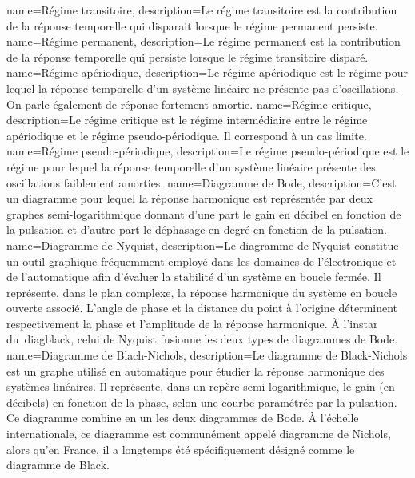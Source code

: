 %
{%
  name={Régime transitoire},%
  description={Le régime transitoire est la contribution de la réponse 
  temporelle qui disparait lorsque le régime permanent persiste.
  }
}
%
{%
  name={Régime permanent},%
  description={Le régime permanent est la contribution de la réponse temporelle 
  qui persiste lorsque le régime transitoire disparé.
  }
}
%
{%
  name={Régime apériodique},%
  description={Le régime apériodique est le régime pour lequel la réponse 
  temporelle d'un système linéaire ne présente pas d'oscillations. On parle
  également de réponse fortement amortie.
  }
}
%
{%
  name={Régime critique},%
  description={Le régime critique est le régime intermédiaire entre le régime
      apériodique et le régime pseudo-périodique. Il correspond à un cas limite.
  }
}
%
{%
  name={Régime pseudo-périodique},%
  description={Le régime pseudo-périodique est le régime pour lequel la réponse
  temporelle d'un système linéaire présente des oscillations faiblement 
  amorties.
  }
}
%
{%
  name={Diagramme de Bode},%
  description={C'est un diagramme pour lequel la réponse harmonique est 
  représentée par deux graphes semi-logarithmique donnant d'une part le gain 
  en décibel en fonction de la pulsation et d'autre part le déphasage en degré
  en fonction de la pulsation.
  }
}
%
{%
  name={Diagramme de Nyquist},%
  description={Le diagramme de Nyquist constitue un outil graphique fréquemment 
               employé dans les domaines de l'électronique et de l'automatique 
               afin d'évaluer la stabilité d'un système en boucle fermée. Il 
               représente, dans le plan complexe, la réponse harmonique du 
               système en boucle ouverte associé. L'angle de phase et la distance 
               du point à l'origine déterminent respectivement la phase 
               et l'amplitude de la réponse harmonique. À l'instar du~\gls{diagblack}, 
               celui de Nyquist fusionne les deux types de diagrammes de Bode.} 
}
%
{%
  name={Diagramme de Blach-Nichols},%
  description={Le diagramme de Black-Nichols est un graphe 
               utilisé en automatique pour étudier la réponse harmonique
               des systèmes linéaires. Il représente, dans un repère 
               semi-logarithmique, le gain (en décibels) en fonction 
               de la phase, selon une courbe paramétrée par la pulsation. 
               Ce diagramme combine en un les deux diagrammes de Bode. 
               À l'échelle internationale, ce diagramme est communément 
               appelé diagramme de Nichols, alors qu'en France, 
               il a longtemps été spécifiquement désigné comme le 
               diagramme de Black.}
}
